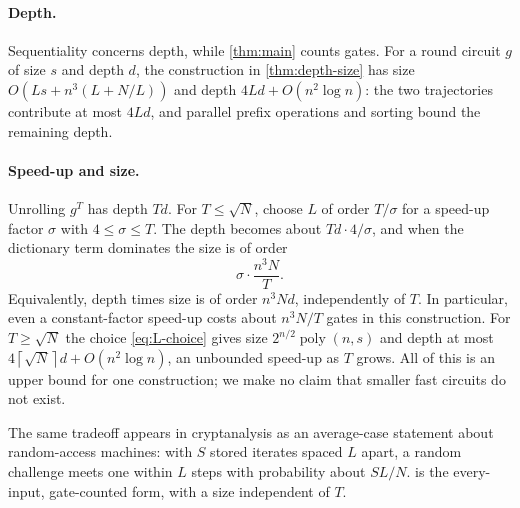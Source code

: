 \documentclass[11pt]{article}
\theoremstyle{definition}
\theoremstyle{remark}
\newcommand{\poly}{\operatorname{poly}}
\newcommand{\ceil}[1]{\left\lceil #1\right\rceil}
\numberwithin{equation}{section}
\begin{document}
\paragraph{Depth.}
Sequentiality concerns depth, while \cref{thm:main} counts gates.
For a round circuit $g$ of size $s$ and depth $d$, the construction in
\cref{thm:depth-size} has size $O(Ls+n^3(L+N/L))$ and depth
$4Ld+O(n^2\log n)$: the two trajectories contribute at most $4Ld$,
and parallel prefix operations and sorting bound the remaining depth.

\paragraph{Speed-up and size.}
Unrolling $g^T$ has depth $Td$.  For $T\leq\sqrt N$, choose $L$ of order
$T/\sigma$ for a speed-up factor $\sigma$ with $4\leq\sigma\leq T$.  The
depth becomes about $Td\cdot4/\sigma$, and when the dictionary term
dominates the size is of order
\[
  \sigma\cdot\frac{n^3N}{T}.
\]
Equivalently, depth times size is of order $n^3Nd$, independently of $T$.
In particular, even a constant-factor speed-up costs about $n^3N/T$
gates in this construction.  For $T\geq\sqrt N$ the choice
\cref{eq:L-choice} gives size $2^{n/2}\poly(n,s)$ and depth at most
$4\ceil{\sqrt N}d+O(n^2\log n)$, an unbounded speed-up as $T$ grows.  All of this
is an upper bound for one construction; we make no claim that smaller
fast circuits do not exist.

The same tradeoff appears in cryptanalysis as an average-case statement
about random-access machines: with $S$ stored iterates spaced $L$ apart,
a random challenge meets one within $L$ steps with probability about
$SL/N$.   is the every-input, gate-counted form, with a
size independent of $T$.
\end{document}
